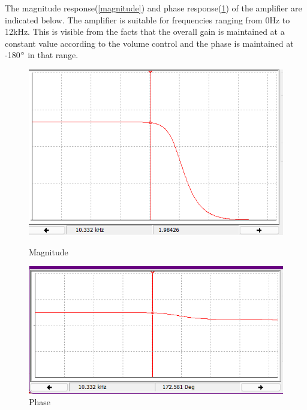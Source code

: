 \documentclass[a4paper,12pt,oneside,pdflatex,italian,final,twocolumn]{article}
\begin{document}
The magnitude response(\ref{magnitude}) and phase response(\ref{phase}) of the amplifier are indicated below. The amplifier is suitable for frequencies ranging from 0Hz to 12kHz. This is visible from the facts that the overall gain is maintained at a constant value according to the volume control and the phase is maintained at -180$\degree$ in that range.
\begin{figure}[h]
    \begin{minipage}{0.47\textwidth}
        \centering
        \includegraphics[width=.55\textwidth]{magnitude}
        \caption{Magnitude}
        \label{magnitude}
    \end{minipage}
    \hfill
    \begin{minipage}{0.47\textwidth}
        \centering
        \includegraphics[width=.65\textwidth]{phase}
        \caption{Phase}
        \label{phase}
    \end{minipage}
\end{figure}
\end{document}
